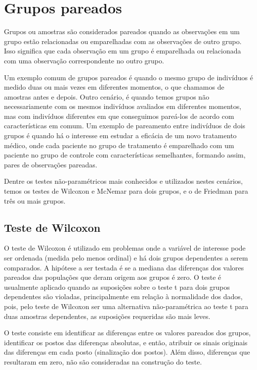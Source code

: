\documentclass[
  letterpaper,
  DIV=11,
  numbers=noendperiod]{scrreprt}
\begin{document}
\hypertarget{grupos-pareados}{%
\section{Grupos pareados}\label{grupos-pareados}}

Grupos ou amostras são considerados pareados quando as observações em um
grupo estão relacionadas ou emparelhadas com as observações de outro
grupo. Isso significa que cada observação em um grupo é emparelhada ou
relacionada com uma observação correspondente no outro grupo.

Um exemplo comum de grupos pareados é quando o mesmo grupo de indivíduos
é medido duas ou mais vezes em diferentes momentos, o que chamamos de
amostras antes e depois. Outro cenário, é quando temos grupos não
necessariamente com os mesmos indivíduos avaliados em diferentes
momentos, mas com indivíduos diferentes em que conseguimos pareá-los de
acordo com características em comum. Um exemplo de pareamento entre
indivíduos de dois grupos é quando há o interesse em estudar a eficácia
de um novo tratamento médico, onde cada paciente no grupo de tratamento
é emparelhado com um paciente no grupo de controle com características
semelhantes, formando assim, pares de observações pareadas.

Dentre os testes não-paramétricos mais conhecidos e utilizados nestes
cenários, temos os testes de Wilcoxon e McNemar para dois grupos, e o de
Friedman para três ou mais grupos.

\hypertarget{teste-de-wilcoxon}{%
\subsection{Teste de Wilcoxon}\label{teste-de-wilcoxon}}

O teste de Wilcoxon é utilizado em problemas onde a variável de
interesse pode ser ordenada (medida pelo menos ordinal) e há dois grupos
dependentes a serem comparados. A hipótese a ser testada é se a mediana
das diferenças dos valores pareados das populações que deram origem aos
grupos é zero. O teste é usualmente aplicado quando as suposições sobre
o teste t para dois grupos dependentes são violadas, principalmente em
relação à normalidade dos dados, pois, pelo teste de Wilcoxon ser uma
alternativa não-paramétrica ao teste t para duas amostras dependentes,
as suposições requeridas são mais leves.

O teste consiste em identificar as diferenças entre os valores pareados
dos grupos, identificar os postos das diferenças absolutas, e então,
atribuir os sinais originais das diferenças em cada posto (sinalização
dos postos). Além disso, diferenças que resultaram em zero, não são
consideradas na construção do teste.
\end{document}
